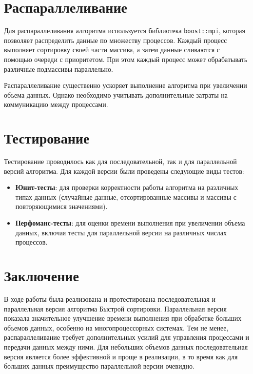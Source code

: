 \documentclass[a4paper,12pt]{article}
\begin{document}
\section*{Распараллеливание}
Для распараллеливания алгоритма используется библиотека \texttt{boost::mpi}, которая позволяет распределить данные по множеству процессов. Каждый процесс выполняет сортировку своей части массива, а затем данные сливаются с помощью очереди с приоритетом. При этом каждый процесс может обрабатывать различные подмассивы параллельно.

Распараллеливание существенно ускоряет выполнение алгоритма при увеличении объема данных. Однако необходимо учитывать дополнительные затраты на коммуникацию между процессами.

\section*{Тестирование}
Тестирование проводилось как для последовательной, так и для параллельной версий алгоритма. Для каждой версии были проведены следующие виды тестов:
\begin{itemize}
\item \textbf{Юнит-тесты}: для проверки корректности работы алгоритма на различных типах данных (случайные данные, отсортированные массивы и массивы с повторяющимися значениями).
\item \textbf{Перфоманс-тесты}: для оценки времени выполнения при увеличении объема данных, включая тесты для параллельной версии на различных числах процессов.
\end{itemize}

\section*{Заключение}
В ходе работы была реализована и протестирована последовательная и параллельная версия алгоритма Быстрой сортировки. Параллельная версия показала значительное улучшение времени выполнения при обработке больших объемов данных, особенно на многопроцессорных системах. Тем не менее, распараллеливание требует дополнительных усилий для управления процессами и передачи данных между ними. Для небольших объемов данных последовательная версия является более эффективной и проще в реализации, в то время как для больших данных преимущество параллельной версии очевидно.
\end{document}

